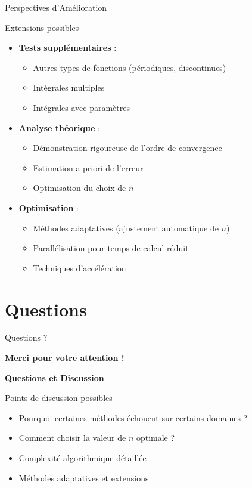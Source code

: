 \documentclass[aspectratio=169,11pt]{beamer}
\begin{document}
\begin{frame}{Perspectives d'Amélioration}
\vspace{-0.2cm}
\begin{block}{Extensions possibles}
\small
\begin{itemize}
\item \textbf{Tests supplémentaires} :
\begin{itemize}
\item Autres types de fonctions (périodiques, discontinues)
\item Intégrales multiples
\item Intégrales avec paramètres
\end{itemize}
\item \textbf{Analyse théorique} :
\begin{itemize}
\item Démonstration rigoureuse de l'ordre de convergence
\item Estimation a priori de l'erreur
\item Optimisation du choix de $n$
\end{itemize}
\item \textbf{Optimisation} :
\begin{itemize}
\item Méthodes adaptatives (ajustement automatique de $n$)
\item Parallélisation pour temps de calcul réduit
\item Techniques d'accélération
\end{itemize}
\end{itemize}
\end{block}
\end{frame}

\section{Questions}

\begin{frame}{Questions ?}
\begin{center}
\Large
\textbf{Merci pour votre attention !}

\vspace{1cm}

\textbf{Questions et Discussion}
\end{center}

\vspace{1cm}

\begin{block}{Points de discussion possibles}
\begin{itemize}
\item Pourquoi certaines méthodes échouent sur certains domaines ?
\item Comment choisir la valeur de $n$ optimale ?
\item Complexité algorithmique détaillée
\item Méthodes adaptatives et extensions
\end{itemize}
\end{block}
\end{frame}
\end{document}
